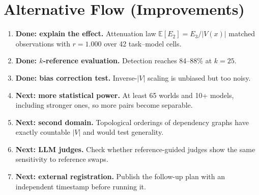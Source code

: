 \documentclass[11pt,a4paper]{article}
\newcommand{\E}[1]{E_{#1}}
\begin{document}
\section{Alternative Flow (Improvements)}
\begin{enumerate}
\item \textbf{Done: explain the effect.} Attenuation law $\mathbb{E}[\E2]=\E3/|V(x)|$ matched observations with $r=1.000$ over 42 task--model cells.
\item \textbf{Done: $k$-reference evaluation.} Detection reaches 84--88\% at $k=25$.
\item \textbf{Done: bias correction test.} Inverse-$|V|$ scaling is unbiased but too noisy.
\item \textbf{Next: more statistical power.} At least 65 worlds and 10+ models, including stronger ones, so more pairs become separable.
\item \textbf{Next: second domain.} Topological orderings of dependency graphs have exactly countable $|V|$ and would test generality.
\item \textbf{Next: LLM judges.} Check whether reference-guided judges show the same sensitivity to reference swaps.
\item \textbf{Next: external registration.} Publish the follow-up plan with an independent timestamp before running it.
\end{enumerate}
\end{document}
